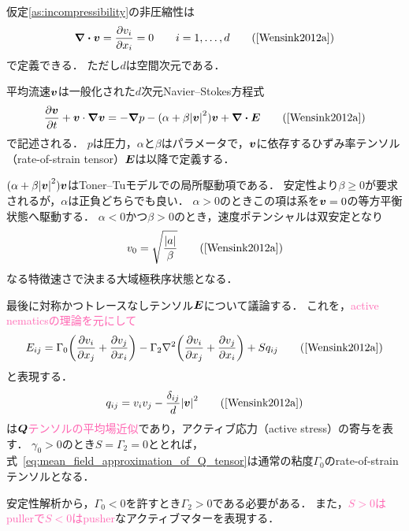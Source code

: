 \documentclass[12pt,dvipdfmx,svgnames,a4paper,uplatex]{ujarticle}
\theoremstyle{plain}
\begin{document}
仮定\ref{as:incompressibility}の非圧縮性は
\begin{equation}
  \div{\vb*{v}} = \pdv{v_i}{x_i} = 0 \qquad i=1,\dots,d
  \label{eq:incompressibility}
  \tag{\cite[Eq. 16]{Wensink2012a}}
\end{equation}
で定義できる．
ただし\(d\)は空間次元である．

平均流速\(\vb*{v}\)は一般化された\(d\)次元Navier--Stokes方程式
\begin{equation}
  \pdv{\vb*{v}}{t} + \vb*{v} \cdot \grad{\vb*{v}} = -\grad{p} - (\alpha + \beta \abs{\vb*{v}}^2) \vb*{v} + \div{\vb*{E}}
  \label{eq:generalised_NS}
  \tag{\cite[Eq. 17]{Wensink2012a}}
\end{equation}
で記述される．
\(p\)は圧力，\(\alpha\)と\(\beta\)はパラメータで，\(\vb*{v}\)に依存するひずみ率テンソル（rate-of-strain tensor）\(\vb*{E}\)は以降で定義する．

\((\alpha + \beta \abs{\vb*{v}}^2) \vb*{v}\)はToner--Tuモデルでの局所駆動項である．
安定性より\(\beta \ge 0\)が要求されるが，\(\alpha\)は正負どちらでも良い．
\(\alpha > 0\)のときこの項は系を\(\vb*{v}=0\)の等方平衡状態へ駆動する．
\(\alpha < 0\)かつ\(\beta > 0\)のとき，速度ポテンシャルは双安定となり
\begin{equation}
  v_0 = \sqrt{\frac{\abs{a}}{\beta}}
  \label{eq:bistable_velocity_potential}
  \tag{\cite[Eq. 18]{Wensink2012a}}
\end{equation}
なる特徴速さで決まる大域極秩序状態となる．

最後に対称かつトレースなしテンソル\(\vb*{E}\)について議論する．
これを，\textcolor{HotPink}{active nematicsの理論を元にして}
\begin{equation}
  E_{ij} = \Gamma_0 \qty(\pdv{v_i}{x_j} + \pdv{v_j}{x_i}) - \Gamma_2 \laplacian \qty(\pdv{v_i}{x_j} + \pdv{v_j}{x_i}) + S q_{ij}
  \label{eq:rate-of-strain_tensor}
  \tag{\cite[Eq. 19]{Wensink2012a}}
\end{equation}
と表現する．
\begin{equation}
  q_{ij} = v_i v_j - \frac{\delta_{ij}}{d} \abs{\vb*{v}}^2
  \label{eq:mean_field_approximation_of_Q_tensor}
  \tag{\cite[Eq. 20]{Wensink2012a}}
\end{equation}
は\textcolor{HotPink}{\(\vb*{Q}\)テンソルの平均場近似}であり，アクティブ応力（active stress）の寄与を表す．
\(\gamma_0 > 0\)のとき\(S=\Gamma_2=0\)ととれば，式~\ref{eq:mean_field_approximation_of_Q_tensor}は通常の粘度\(\Gamma_0\)のrate-of-strainテンソルとなる．

安定性解析から，\(\Gamma_0 < 0\)を許すとき\(\Gamma_2 > 0\)である必要がある．
また，\textcolor{HotPink}{\(S>0\)はpullerで\(S<0\)はpusher}なアクティブマターを表現する．
\end{document}
